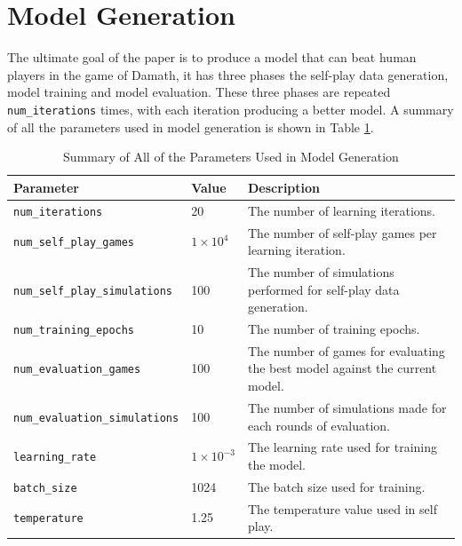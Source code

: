 \section{Model Generation}

The ultimate goal of the paper is to produce a model that can beat human players in the game of Damath, it has three phases the self-play data generation, model training and model evaluation. These three phases are repeated \verb|num_iterations| times, with each iteration producing a better model. A summary of all the parameters used in model generation is shown in Table \ref{tab:configuration-summary}.

\begin{table}[htb]
  \centering
  \begin{tabular}{llp{7.5cm}}
    \hline 
    Parameter                             & Value              & Description                                                                  \\ \hline
    \texttt{num\_iterations}              & 20                 & The number of learning iterations.                                           \\
    \texttt{num\_self\_play\_games}       & $1 \times 10^4$    & The number of self-play games per learning iteration.                        \\
    \texttt{num\_self\_play\_simulations} & 100                & The number of simulations performed for self-play data generation.           \\
    \texttt{num\_training\_epochs}        & 10                 & The number of training epochs.                                               \\
    \texttt{num\_evaluation\_games}       & 100                & The number of games for evaluating the best model against the current model. \\
    \texttt{num\_evaluation\_simulations} & 100                & The number of simulations made for each rounds of evaluation.                \\
    \texttt{learning\_rate}               & $1 \times 10^{-3}$ & The learning rate used for training the model.                               \\
    \texttt{batch\_size}                  & 1024               & The batch size used for training.                                            \\
    \texttt{temperature}                  & 1.25               & The temperature value used in self play.                                     \\ \hline
  \end{tabular}
  \caption{Summary of All of the Parameters Used in Model Generation}
  \label{tab:configuration-summary}
\end{table}

